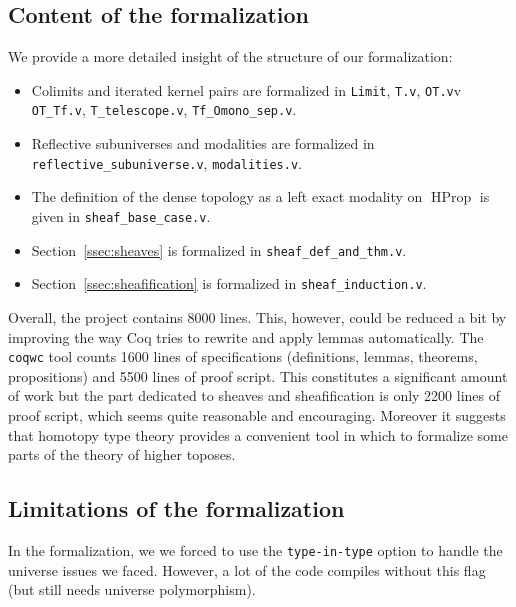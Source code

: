 \documentclass[notfinal]{jfrarticle}
\DeclareMathOperator{\HProp}{HProp}
\begin{document}
\subsection{Content of the formalization}
\label{ssec:cont-form}

We provide a more detailed insight of the structure of our formalization:
\begin{itemize} 
\item Colimits and iterated kernel pairs are formalized in
\texttt{Limit}, \texttt{T.v}, \texttt{OT.v}v \texttt{OT\_Tf.v}, \texttt{T\_telescope.v}, \texttt{Tf\_Omono\_sep.v}.%
\item
Reflective subuniverses and modalities are formalized in\\
\texttt{reflective\_subuniverse.v}, \texttt{modalities.v}. %
\item 
%
  The definition of the dense topology as a left exact modality on
  $\HProp$ is given in \texttt{sheaf\_base\_case.v}. %
\item
Section~\ref{ssec:sheaves} is formalized in
\texttt{sheaf\_def\_and\_thm.v}. %
\item
Section~\ref{ssec:sheafification} is formalized in
\texttt{sheaf\_induction.v}. %
\end{itemize}

Overall, %
the project
contains 8000 lines. This, however, could be reduced a bit by improving the
way Coq tries to rewrite and apply lemmas automatically. 
The \texttt{coqwc} tool counts 1600 lines of specifications
(definitions, lemmas, theorems, propositions) and 5500 lines of proof
script.
%
This constitutes a significant amount of work but the part dedicated
to sheaves and sheafification is only 2200 lines of proof script,
which seems quite reasonable and encouraging. Moreover it suggests
that homotopy type theory provides a convenient tool in which to formalize some
parts of the theory of higher toposes. 

\subsection{Limitations of the formalization}
\label{ssec:limit-form}

In the formalization, we we forced to use the \texttt{type-in-type} option to handle
the universe issues we faced. However, a lot of the code compiles
without this flag (but still needs universe polymorphism). 
\end{document}
